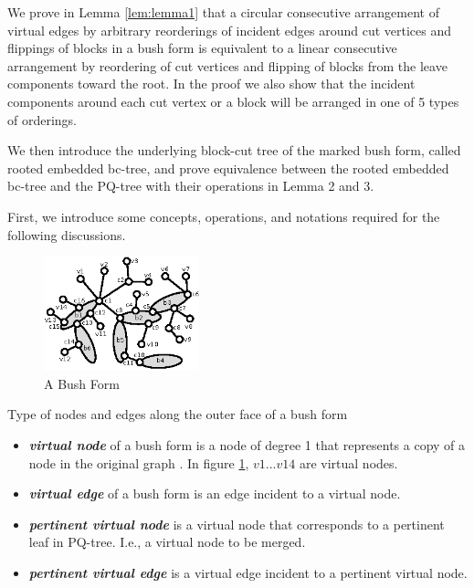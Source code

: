\documentclass[a4]{jgaa-art}
\newenvironment{definition}[1][Definition]{\begin{trivlist}
\item[\hskip \labelsep {\bfseries #1}]}{\end{trivlist}}
\begin{document}
We prove in Lemma \ref{lem:lemma1} that a circular consecutive arrangement of virtual edges 
by arbitrary reorderings of incident edges around cut vertices and flippings of blocks in a bush form is
 equivalent to a linear consecutive arrangement by reordering of cut vertices and flipping of blocks
 from the leave components toward the root. In the proof we also show that the incident components
 around each cut vertex or a block will be arranged in one of 5 types of orderings.

We then introduce the underlying block-cut tree of the marked bush form, called rooted embedded bc-tree, 
and prove equivalence between the rooted embedded bc-tree and the PQ-tree with their operations in Lemma 2 and 3.

First, we introduce some concepts, operations, and notations required for the following discussions.


\begin{figure}[!htb]
  \centering
  \includegraphics[width=0.4\textwidth]{marked_bush_form_00}
  \caption{A Bush Form}
  \label{fig:bush_form}
\end{figure}

\begin{definition}
Type of nodes and edges along the outer face of a bush form
\begin{itemize}
\item {\bf \emph{virtual node}} of a bush form is a node of degree 1 that represents a copy of a node
in the original graph \cite{EVEN79}. In figure \ref{fig:bush_form}, $v1$...$v14$ are virtual nodes.
\item {\bf \emph{virtual edge}} of a bush form is an edge incident to a virtual node.
\item {\bf \emph{pertinent virtual node}} is a virtual node that  corresponds to a pertinent leaf
in PQ-tree. I.e., a virtual node to be merged.
\item {\bf \emph{pertinent virtual edge}} is a virtual edge incident to a pertinent virtual node.
\end{itemize}
\end{definition}
\end{document}
